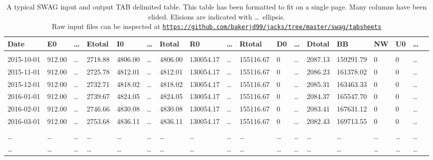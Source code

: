 \begin{sidewaystable}
\centering
\scriptsize
{}
\begin{tabular}{llllllllllllllllll}
\bf{Date} &\bf{E0}  &\ldots &\bf{Etotal}   &\bf{I0}  &\ldots &\bf{Itotal}   &\bf{R0}  &\ldots &\bf{Rtotal}  &\bf{D0} &\ldots &\bf{Dtotal}  &\bf{BB}  &\bf{NW}   &\bf{U0} &\ldots \\ \hline
&&&&&&&&&&&&&&&&\\ 
2015-10-01 &912.00  &\ldots &2718.88  &4806.00  &\ldots &4806.00  &130054.17  &\ldots &155116.67  &0  &\ldots &2087.13 &159291.79  &0 &0  &\ldots \\
2015-11-01 &912.00  &\ldots &2725.78  &4812.01  &\ldots &4812.01  &130054.17  &\ldots &155116.67  &0  &\ldots &2086.23 &161378.02  &0 &0  &\ldots \\
2015-12-01 &912.00  &\ldots &2732.71  &4818.02  &\ldots &4818.02  &130054.17  &\ldots &155116.67  &0  &\ldots &2085.31 &163463.33  &0 &0  &\ldots \\
2016-01-01 &912.00  &\ldots &2739.67  &4824.05  &\ldots &4824.05  &130054.17  &\ldots &155116.67  &0  &\ldots &2084.37 &165547.70  &0 &0  &\ldots \\
2016-02-01 &912.00  &\ldots &2746.66  &4830.08  &\ldots &4830.08  &130054.17  &\ldots &155116.67  &0  &\ldots &2083.41 &167631.12  &0 &0  &\ldots \\
2016-03-01 &912.00  &\ldots &2753.68  &4836.11  &\ldots &4836.11  &130054.17  &\ldots &155116.67  &0  &\ldots &2082.43 &169713.55  &0 &0  &\ldots \\ 
&&&&&&&&&&&&&&&&\\ 
\ldots &\ldots  &\ldots &\ldots  &\ldots &\ldots &\ldots  &\ldots  &\ldots &\ldots  &\ldots  &\ldots &\ldots &\ldots  &\ldots &\ldots  &\ldots \\ 
\ldots &\ldots  &\ldots &\ldots  &\ldots &\ldots &\ldots  &\ldots  &\ldots &\ldots  &\ldots  &\ldots &\ldots &\ldots  &\ldots &\ldots  &\ldots \\ \hline
\end{tabular}
\normalsize
\caption{A typical SWAG input and output TAB delimited table. This table has been formatted to fit on a single page. Many columns 
have been elided. Elisions are indicated with \ldots\ ellipsis.
\vspace{5pt}
\\
Raw input files can be inspected at \href{https://github.com/bakerjd99/jacks/tree/master/swag/tabsheets}{\texttt{https://github.com/bakerjd99/jacks/tree/master/swag/tabsheets}}}
\label{tab:5175x1}
\end{sidewaystable}

